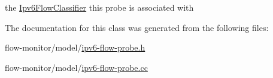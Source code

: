 the \hyperlink{classns3_1_1Ipv6FlowClassifier}{Ipv6\+Flow\+Classifier} this probe is associated with 



The documentation for this class was generated from the following files\+:\begin{DoxyCompactItemize}
\item 
flow-\/monitor/model/\hyperlink{ipv6-flow-probe_8h}{ipv6-\/flow-\/probe.\+h}\item 
flow-\/monitor/model/\hyperlink{ipv6-flow-probe_8cc}{ipv6-\/flow-\/probe.\+cc}\end{DoxyCompactItemize}
